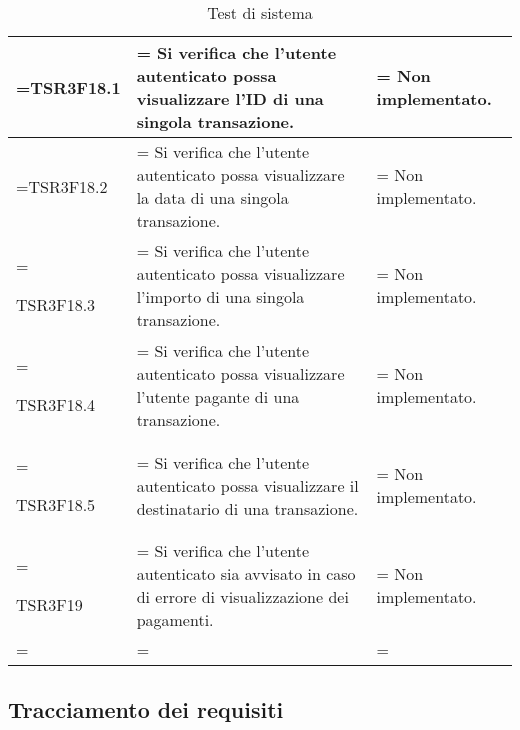 \begin{xltabular}{\textwidth} {
        >{\hsize\linewidth=\hsize}X
        >{\hsize\linewidth=\hsize}X
        >{\hsize\linewidth=\hsize}X
    }
    TSR3F18.1 &
    Si verifica che l'utente autenticato possa visualizzare l'ID di una singola transazione. &
    Non implementato.
    \\ \hline


    TSR3F18.2 &
    Si verifica che l'utente autenticato possa visualizzare la data di una singola transazione. &
    Non implementato.
    \\ \hline

    TSR3F18.3 &
    Si verifica che l'utente autenticato possa visualizzare l'importo di una singola transazione. &
    Non implementato.
    \\ \hline

    TSR3F18.4 &
    Si verifica che l'utente autenticato possa visualizzare l'utente pagante di una transazione. &
    Non implementato.
    \\ \hline

    TSR3F18.5 &
    Si verifica che l'utente autenticato possa visualizzare il destinatario di una transazione. &
    Non implementato.
    \\ \hline

    TSR3F19 &
    Si verifica che l'utente autenticato sia avvisato in caso di errore di visualizzazione dei pagamenti. &
    Non implementato.
    \\ \hline


    \caption{Test di sistema}
\end{xltabular}

\subsection{Tracciamento dei requisiti}

